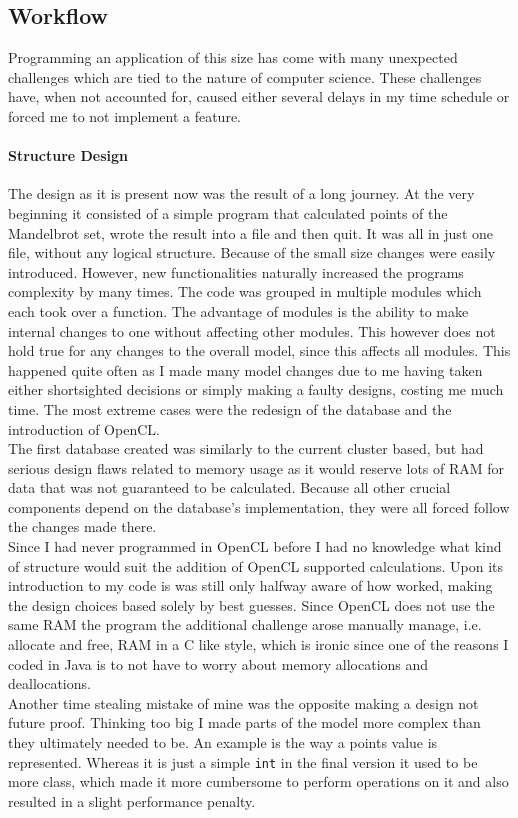 \documentclass[10pt,a4paper,titlepage]{article}
\begin{document}
	\subsection{Workflow}
	Programming an application of this size has come with many unexpected challenges which are tied to the nature of computer science. These challenges have, when not accounted for, caused either several delays in my time schedule or forced me to not implement a feature.
	\paragraph{Structure Design}
	The design as it is present now was the result of a long journey. At the very beginning it consisted of a simple program that calculated points of the Mandelbrot set, wrote the result into a file and then quit. It was all in just one file, without any logical structure. Because of the small size changes were easily introduced. However, new functionalities naturally increased the programs complexity by many times. The code was grouped in multiple modules which each took over a function. The advantage of modules is the ability to make internal changes to one without affecting other modules. This however does not hold true for any changes to the overall model, since this affects all modules. This happened quite often as I made many model changes due to me having taken either shortsighted decisions or simply making a faulty designs, costing me much time. The most extreme cases were the redesign of the database and the introduction of OpenCL.\\
	The first database created was similarly to the current cluster based, but had serious design flaws related to memory usage as it would reserve lots of RAM for data that was not guaranteed to be calculated. Because all other crucial components depend on the database's implementation, they were all forced follow the changes made there.\\
	Since I had never programmed in OpenCL before I had no knowledge what kind of structure would suit the addition of OpenCL supported calculations. Upon its introduction to my code is was still only halfway aware of how worked, making the design choices based solely by best guesses. Since OpenCL does not use the same RAM the program the additional challenge arose manually manage, i.e. allocate and free, RAM in a C like style, which is ironic since one of the reasons I coded in Java is to not have to worry about memory allocations and deallocations.\\
	Another time stealing mistake of mine was the opposite making a design not future proof. Thinking too big I made parts of the model more complex than they ultimately needed to be. An example is the way a points value is represented. Whereas it is just a simple \verb|int| in the final version it used to be more class, which made it more cumbersome to perform operations on it and also resulted in a slight performance penalty.
\end{document}
